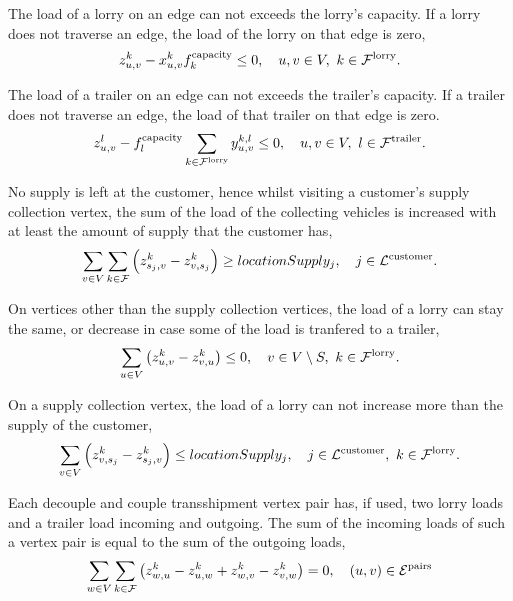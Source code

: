 The load of a lorry on an edge can not exceeds the lorry's capacity.
If a lorry does not traverse an edge, the load of the lorry on that edge is zero,
\begin{align}
  z_{u,v}^k  - x^{k}_{u,v}  f_k^{\rm capacity}  \leq 0, \quad
  u,v \in V,
  \ k \in \mathcal F^{\rm lorry}.
\end{align}



The load of a trailer on an edge can not exceeds the trailer's capacity. If a trailer does not traverse an edge, the load of that trailer on that edge is zero.
\begin{align}
  z_{u,v}^l  - f_l^{\rm capacity}  \sum_{ k \in \mathcal F^{\rm lorry} } y^{k,l}_{u,v}   \leq 0, \quad
  u,v \in V,
  \ l \in \mathcal F^{\rm trailer}.
\end{align}



No supply is left at the customer, hence
whilst visiting a customer's supply collection vertex, the sum of the load of the collecting vehicles is increased with at least the amount of supply that the customer has,
\begin{align}
  \label{eq:supply}
  \sum_{v \in V}
  \sum_{ k \in \mathcal F }
  \left(
    z^k_{s_j,v}
  -
    z^k_{v,s_j}
  \right)
    \geq locationSupply_j, \quad
    j \in \mathcal L^{\rm customer}.
\end{align}






On vertices other than the supply collection vertices, the load of a lorry can stay the same, or decrease in case some of the load is tranfered to a trailer,
\begin{align}
  \sum_{u \in V} \left( z^k_{u,v} - z^k_{v,u} \right)  \leq 0, \quad
  v \in V \setminus S,
  \ k \in \mathcal F^{\rm lorry}.
\end{align}


On a supply collection vertex, the load of a lorry can not increase more than the supply of the customer,
\begin{align}
  \sum_{v \in V} \left( z^k_{v,s_j} - z^k_{s_j,v} \right)  \leq locationSupply_j, \quad
  j \in \mathcal L^{\rm customer},
  \ k \in \mathcal F^{\rm lorry}.
\end{align}

Each decouple and couple transshipment vertex pair has, if used, two lorry loads and a trailer load incoming and outgoing.
The sum of the incoming loads of such a vertex pair is equal to the sum of the  outgoing loads,
\begin{align}
  \sum_{w \in V}
  \sum_{k \in \mathcal F}
  \left(
  z^k_{w,u} -  z^k_{u,w}  + z^k_{w,v} - z^k_{v,w}
  \right)
  = 0,  \quad
  (u,v) \in \mathcal E^{\rm pairs}
\end{align}





